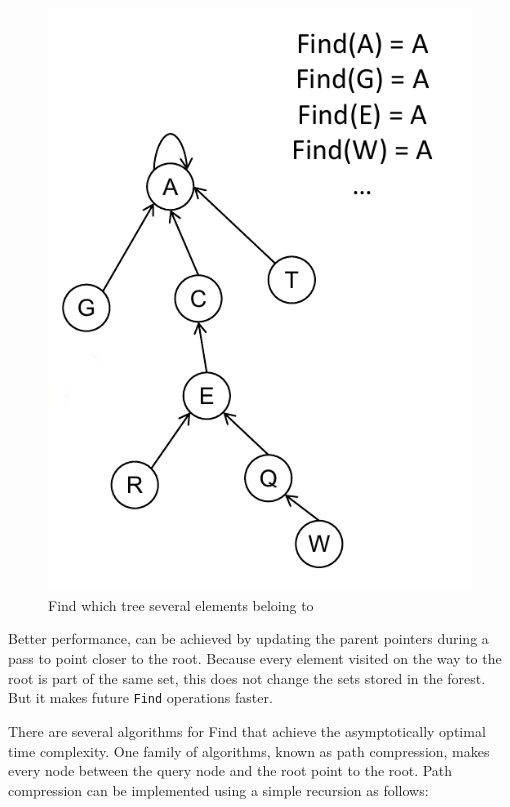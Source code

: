 \documentclass[
]{book}
\begin{document}
\begin{figure}

{\centering \includegraphics{img/07-image05} 

}

\caption{Find which tree several elements beloing to}\label{fig:find}
\end{figure}

Better performance, can be achieved by updating the parent pointers during a pass to point closer to the root. Because every element visited on the way to the root is part of the same set, this does not change the sets stored in the forest. But it makes future \texttt{Find} operations faster.

There are several algorithms for Find that achieve the asymptotically optimal time complexity. One family of algorithms, known as path compression, makes every node between the query node and the root point to the root. Path compression can be implemented using a simple recursion as follows:
\end{document}
